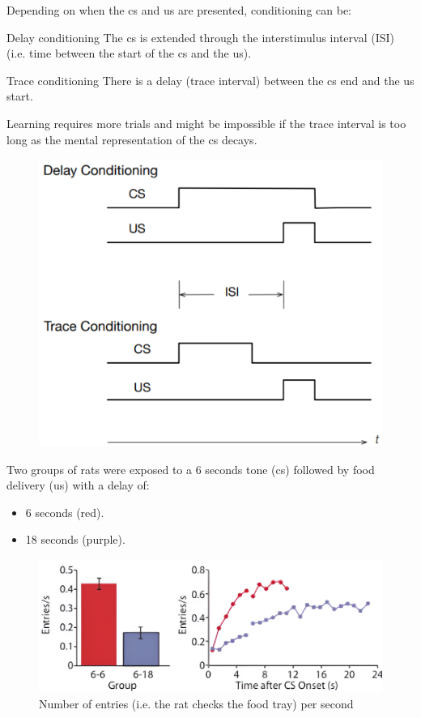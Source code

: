 Depending on when the \ac{cs} and \ac{us} are presented, conditioning can be:
\begin{descriptionlist}
    \item[Delay conditioning] 
        The \ac{cs} is extended through the interstimulus interval (ISI) (i.e. time between the start of the \ac{cs} and the \ac{us}).

    \item[Trace conditioning] 
        There is a delay (trace interval) between the \ac{cs} end and the \ac{us} start.

        Learning requires more trials and might be impossible if the trace interval is too long as the mental representation of the \ac{cs} decays.

    \begin{figure}[H]
        \centering
        \includegraphics[width=0.45\linewidth]{./img/contiguity.png}
    \end{figure}
\end{descriptionlist}

\begin{example}
    Two groups of rats were exposed to a 6 seconds tone (\ac{cs}) followed by food delivery (\ac{us}) with a delay of: 
    \begin{itemize}
        \item 6 seconds (red).
        \item 18 seconds (purple).
    \end{itemize}

    \begin{figure}[H]
        \centering
        \includegraphics[width=0.55\linewidth]{./img/contiguity_rats.png}
        \caption{Number of entries (i.e. the rat checks the food tray) per second}
    \end{figure}
\end{example}


